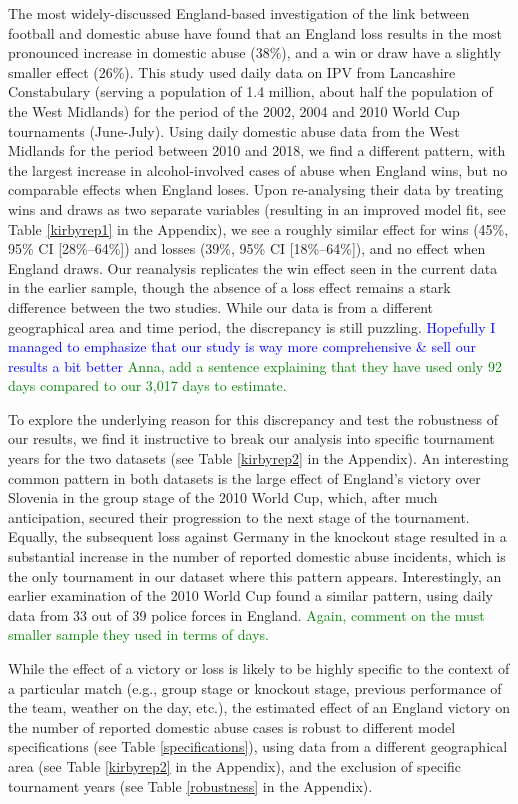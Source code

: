 \documentclass[12pt, letterpaper]{article}
\newcommand{\NS}[1] {{\textcolor{green}{#1}}}
\newcommand{\AT}[1] {{\textcolor{blue}{#1}}}
\begin{document}
The most widely-discussed England-based investigation of the link between football and domestic abuse have found that an England loss results in the most pronounced increase in domestic abuse (38\%), and a win or draw have a slightly smaller effect (26\%)\autocite{Kirby2014}. This study used daily data on IPV from Lancashire Constabulary (serving a population of 1.4 million, about half the population of the West Midlands) for the period of the 2002, 2004 and 2010 World Cup tournaments (June-July). 
Using daily domestic abuse data from the West Midlands for the period between 2010 and 2018, we find a different pattern, with the largest increase in alcohol-involved cases of abuse when England wins, but no comparable effects when England loses. Upon re-analysing their data by treating wins and draws as two separate variables (resulting in an improved model fit, see Table \ref{kirbyrep1} in the Appendix), we see a roughly similar effect for wins (45\%, 95\% CI [28\%--64\%]) and losses (39\%, 95\% CI [18\%--64\%]), and no effect when England draws. Our reanalysis replicates the win effect seen in the current data in the earlier sample, though the absence of a loss effect remains a stark difference between the two studies. While our data is from a different geographical area and time period, the discrepancy is still puzzling. \AT{Hopefully I managed to emphasize that our study is way more comprehensive \& sell our results a bit better} \NS{Anna, add a sentence explaining that they have used only 92 days compared to our 3,017 days to estimate.}


To explore the underlying reason for this discrepancy and test the robustness of our results, we find it instructive to break our analysis into specific tournament years for the two datasets (see Table \ref{kirbyrep2} in the Appendix). An interesting common pattern in both datasets is the large effect of England's victory over Slovenia in the group stage of the 2010 World Cup, which, after much anticipation, secured their progression to the next stage of the tournament. Equally, the subsequent loss against Germany in the knockout stage resulted in a substantial increase in the number of reported domestic abuse incidents, which is the only tournament in our dataset where this pattern appears. Interestingly, an earlier examination of the 2010 World Cup found a similar pattern, using daily data from 33 out of 39 police forces in England\autocite{Brimicombe2012}. \NS{Again, comment on the must smaller sample they used in terms of days.}


While the effect of a victory or loss is likely to be highly specific to the context of a particular match (e.g., group stage or knockout stage, previous performance of the team, weather on the day, etc.), the estimated effect of an England victory on the number of reported domestic abuse cases is robust to different model specifications (see Table \ref{specifications}), using data from a different geographical area (see Table \ref{kirbyrep2} in the Appendix), and the exclusion of specific tournament years (see Table \ref{robustness} in the Appendix). 
\end{document}
